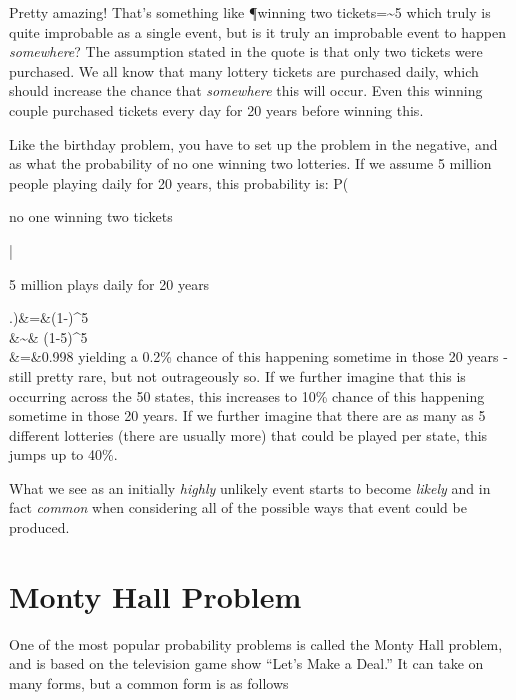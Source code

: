 Pretty amazing!  That's something like
\beq
\P{winning two tickets}=\sim 5
\eeq
which truly is quite improbable as a single event, but is it truly an improbable event to happen \emph{somewhere}?  The assumption stated in the quote is that only two tickets were purchased.  We all know that many lottery tickets are purchased daily, which should increase the chance that \emph{somewhere} this will occur.  Even this winning couple purchased tickets every day for 20 years before winning this.

Like the birthday problem, you have to set up the problem in the negative, and as what the probability of no one winning two lotteries.  If we assume 5 million people playing daily for 20 years, this probability is:
\beq
P\left(\parbox{.7in}{no one winning two tickets}\left|\parbox{.7in}{5 million plays daily for 20 years}\right.\right)&=&\left(1-\right)^{5 }\\
 \nn&\sim& (1-5)^{5 }\\
&=&0.998
\eeq
yielding a 0.2\% chance of this happening sometime in those 20 years - still pretty rare, but not outrageously so.  If we further imagine that this is occurring across the 50 states, this increases to 10\% chance of this happening sometime in those 20 years.  If we further imagine that there are as many as 5 different lotteries (there are usually more) that could be played per state, this jumps up to 40\%.

What we see as an initially \emph{highly} unlikely event starts to become \emph{likely} and in fact \emph{common} when considering all of the possible ways that event could be produced.



\section{Monty Hall Problem}\label{sec:monty}
One of the most popular probability problems is called the Monty Hall problem, and is based on the television game show ``Let's Make a Deal.''\cite{selvin1975problem}  It can take on many forms, but a common form is as follows\cite{vos1990ask}



